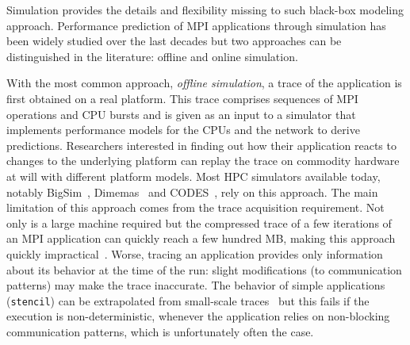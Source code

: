        Simulation provides the details and flexibility missing to such black-box modeling approach. Performance
        prediction of MPI applications through simulation has been widely studied over the last decades but two
        approaches can be distinguished in the literature: offline and online simulation.

        With the most common approach, \emph{offline simulation}, a trace of the application is first obtained on a real
        platform. This trace comprises sequences of MPI operations and CPU bursts and is given as an input to a
        simulator that implements performance models for the CPUs and the network to derive predictions. Researchers
        interested in finding out how their application reacts to changes to the underlying platform can replay the
        trace on commodity hardware at will with different platform models.  Most HPC simulators available today,
        notably BigSim~\cite{bigsim_04}, Dimemas~\cite{dimemas} and CODES~\cite{CODES}, rely on this approach.  The main
        limitation of this approach comes from the trace acquisition requirement. Not only is a large machine required
        but the compressed trace of a few iterations of an MPI application can quickly reach a few hundred MB, making
        this approach quickly impractical~\cite{suter}.  Worse, tracing an application provides only information about
        its behavior at the time of the run: slight modifications (\eg to communication patterns) may make the trace
        inaccurate. The behavior of simple applications (\eg \texttt{stencil}) can be extrapolated from small-scale
        traces~\cite{scalaextrap,pmac_lspp13} but this fails if the execution is non-deterministic, \eg whenever the
        application relies on non-blocking communication patterns, which is unfortunately often the case.

